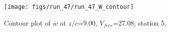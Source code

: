 \begin{figure}[H]
\centering
\texttt{[image: figs/run\_47/run\_47\_W\_contour]}
\caption{Contour plot of $\overline{w}$ at $z/c$=9.00, $V_{free}$=27.08, station 5.}
\end{figure}


